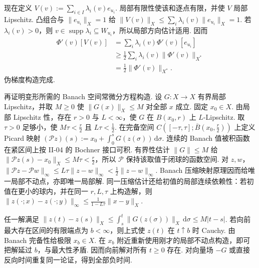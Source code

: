 \begin{FAProof}
现在定义
\(\displaystyle V(v):=\sum_{i\in I}\lambda_i(v)e_{u_i}\).
局部有限性使该和逐点有限，并使 \(\displaystyle V\) 局部 Lipschitz. 凸组合与 \(\displaystyle\|e_{u_i}\|_X=1\) 给
\(\displaystyle \|V(v)\|_X \leqslant \sum_i\lambda_i(v)\|e_{u_i}\|_X =1\).
若 \(\displaystyle\lambda_i(v)>0\)，则 \(\displaystyle v\in\operatorname{supp}\lambda_i\subseteq W_{u_i}\)，所以局部方向估计适用. 因而
\[
\begin{aligned}
\displaystyle \Phi'(v)[V(v)]
&=\displaystyle \sum_i\lambda_i(v)\Phi'(v)[e_{u_i}]\\[6pt]
&\geqslant\displaystyle \frac{1}{2}\sum_i\lambda_i(v)\|\Phi'(v)\|_{X^*}\\[12pt]
&=\displaystyle \frac{1}{2}\|\Phi'(v)\|_{X^*}.
\end{aligned}
\]
伪梯度构造完成.

再证明变形所需的 Banach 空间常微分方程构造. 设 \(\displaystyle G:X\to X\) 有界局部 Lipschitz，并取 \(\displaystyle M\geqslant0\) 使 \(\displaystyle\|G(x)\|_X\leqslant M\) 对全部 \(\displaystyle x\) 成立. 固定 \(\displaystyle x_0\in X\). 由局部 Lipschitz 性，存在 \(\displaystyle r>0\) 与 \(\displaystyle L<\infty\)，使 \(\displaystyle G\) 在 \(\displaystyle B(x_0,r)\) 上 \(\displaystyle L\)-Lipschitz. 取 \(\displaystyle\tau>0\) 足够小，使 \(\displaystyle M\tau<\frac{r}{2}\) 且 \(\displaystyle L\tau<\frac{1}{2}\). 在完备空间 \(\displaystyle C([-\tau,\tau];\overline B(x_0,\frac{r}{2}))\) 上定义 Picard 映射
\(\displaystyle (\mathcal Pz)(s) := x_0+ \int_0^sG(z(\sigma))\,\mathrm{d}\sigma\).
连续的 Banach 值被积函数在紧区间上按 II-04 的 Bochner 接口可积. 有界性估计 \(\displaystyle\|G\|\leqslant M\) 给 \(\displaystyle\|\mathcal Pz(s)-x_0\|_X\leqslant M\tau<\frac{r}{2}\)，所以 \(\displaystyle\mathcal P\) 保持该取值于闭球的函数空间. 对 \(\displaystyle z,w\)，
\(\displaystyle \|\mathcal Pz-\mathcal Pw\|_{\infty} \leqslant L\tau\|z-w\|_{\infty} < \frac{1}{2}\|z-w\|_{\infty}\).
Banach 压缩映射原理因而给唯一局部不动点，亦即唯一局部解. 同一压缩估计还给初值的局部连续依赖性：若初值在更小的球内，并在同一 \(\displaystyle r,L,\tau\) 上构造解，则
\(\displaystyle \|z(\cdot;x)-z(\cdot;y)\|_{\infty} \leqslant \frac{1}{1-L\tau}\|x-y\|_X\).

任一解满足
\(\displaystyle \|z(t)-z(s)\|_X \leqslant \int_s^t\|G(z(\sigma))\|_X\,\mathrm{d}\sigma \leqslant M|t-s|\).
若向前最大存在区间的有限端点为 \(\displaystyle b<\infty\)，则上式使 \(\displaystyle z(t)\) 在 \(\displaystyle t\uparrow b\) 时 Cauchy. 由 Banach 完备性给极限 \(\displaystyle x_b\in X\). 在 \(\displaystyle x_b\) 附近重新使用刚才的局部不动点构造，即可把解延过 \(\displaystyle b\)，与最大性矛盾. 因而向前解对所有 \(\displaystyle t\geqslant0\) 存在. 对向量场 \(\displaystyle-G\) 或直接反向时间重复同一论证，得到全部负时间.


\end{FAProof}
